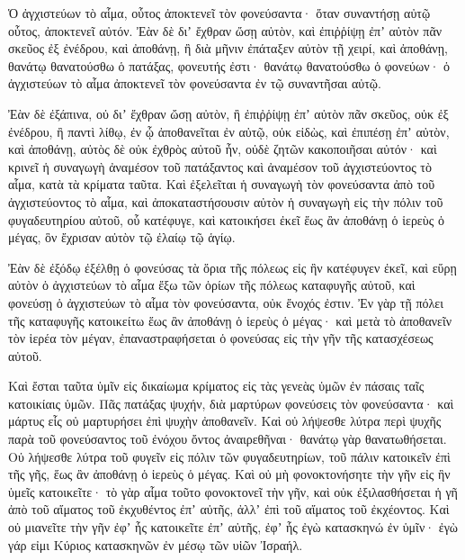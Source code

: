 {\par }{\PP {}Ὁ ἀγχιστεύων τὸ αἷμα, οὗτος ἀποκτενεῖ τὸν φονεύσαντα· ὅταν συναντήσῃ αὐτῷ οὗτος, ἀποκτενεῖ αὐτόν.
Ἐὰν δὲ διʼ ἔχθραν ὤσῃ αὐτὸν, καὶ ἐπιῤῥίψῃ ἐπʼ αὐτὸν πᾶν σκεῦος ἐξ ἐνέδρου, καὶ ἀποθάνῃ,
ἢ διὰ μῆνιν ἐπάταξεν αὐτὸν τῇ χειρί, καὶ ἀποθάνῃ, θανάτῳ θανατούσθω ὁ πατάξας, φονευτής ἐστι· θανάτῳ θανατούσθω ὁ φονεύων· ὁ ἀγχιστεύων τὸ αἷμα ἀποκτενεῖ τὸν φονεύσαντα ἐν τῷ συναντῆσαι αὐτῷ.
\par }{\PP {}Ἐὰν δὲ ἐξάπινα, οὐ διʼ ἔχθραν ὤσῃ αὐτὸν, ἢ ἐπιῤῥίψῃ ἐπʼ αὐτὸν πᾶν σκεῦος, οὐκ ἐξ ἐνέδρου,
ἢ παντὶ λίθῳ, ἐν ᾧ ἀποθανεῖται ἐν αὐτῷ, οὐκ εἰδὼς, καὶ ἐπιπέσῃ ἐπʼ αὐτὸν, καὶ ἀποθάνῃ, αὐτὸς δὲ οὐκ ἐχθρὸς αὐτοῦ ἦν, οὐδὲ ζητῶν κακοποιῆσαι αὐτόν·
καὶ κρινεῖ ἡ συναγωγὴ ἀναμέσον τοῦ πατάξαντος καὶ ἀναμέσον τοῦ ἀγχιστεύοντος τὸ αἷμα, κατὰ τὰ κρίματα ταῦτα.
Καὶ ἐξελεῖται ἡ συναγωγὴ τὸν φονεύσαντα ἀπὸ τοῦ ἀγχιστεύοντος τὸ αἷμα, καὶ ἀποκαταστήσουσιν αὐτὸν ἡ συναγωγὴ εἰς τὴν πόλιν τοῦ φυγαδευτηρίου αὐτοῦ, οὗ κατέφυγε, καὶ κατοικήσει ἐκεῖ ἕως ἂν ἀποθάνῃ ὁ ἱερεὺς ὁ μέγας, ὃν ἔχρισαν αὐτὸν τῷ ἐλαίῳ τῷ ἁγίῳ.
\par }{\PP {}Ἐὰν δὲ ἐξόδῳ ἐξέλθῃ ὁ φονεύσας τὰ ὅρια τῆς πόλεως εἰς ἣν κατέφυγεν ἐκεῖ,
καὶ εὕρῃ αὐτὸν ὁ ἀγχιστεύων τὸ αἷμα ἔξω τῶν ὁρίων τῆς πόλεως καταφυγῆς αὐτοῦ, καὶ φονεύσῃ ὁ ἀγχιστεύων τὸ αἷμα τὸν φονεύσαντα, οὐκ ἔνοχός ἐστιν.
Ἐν γὰρ τῇ πόλει τῆς καταφυγῆς κατοικείτω ἕως ἂν ἀποθάνῃ ὁ ἱερεὺς ὁ μέγας· καὶ μετὰ τὸ ἀποθανεῖν τὸν ἱερέα τὸν μέγαν, ἐπαναστραφήσεται ὁ φονεύσας εἰς τὴν γῆν τῆς κατασχέσεως αὐτοῦ.
\par }{\PP {}Καὶ ἔσται ταῦτα ὑμῖν εἰς δικαίωμα κρίματος εἰς τὰς γενεὰς ὑμῶν ἐν πάσαις ταῖς κατοικίαις ὑμῶν.
Πᾶς πατάξας ψυχήν, διὰ μαρτύρων φονεύσεις τὸν φονεύσαντα· καὶ μάρτυς εἷς οὐ μαρτυρήσει ἐπὶ ψυχὴν ἀποθανεῖν.
Καὶ οὐ λήψεσθε λύτρα περὶ ψυχῆς παρὰ τοῦ φονεύσαντος τοῦ ἐνόχου ὄντος ἀναιρεθῆναι· θανάτῳ γὰρ θανατωθήσεται.
Οὐ λήψεσθε λύτρα τοῦ φυγεῖν εἰς πόλιν τῶν φυγαδευτηρίων, τοῦ πάλιν κατοικεῖν ἐπὶ τῆς γῆς, ἕως ἂν ἀποθάνῃ ὁ ἱερεὺς ὁ μέγας.
Καὶ οὐ μὴ φονοκτονήσητε τὴν γῆν εἰς ἣν ὑμεῖς κατοικεῖτε· τὸ γὰρ αἷμα τοῦτο φονοκτονεῖ τὴν γῆν, καὶ οὐκ ἐξιλασθήσεται ἡ γῆ ἀπὸ τοῦ αἵματος τοῦ ἐκχυθέντος ἐπʼ αὐτῆς, ἀλλʼ ἐπὶ τοῦ αἵματος τοῦ ἐκχέοντος.
Καὶ οὐ μιανεῖτε τὴν γῆν ἐφʼ ἧς κατοικεῖτε ἐπʼ αὐτῆς, ἐφʼ ἧς ἐγὼ κατασκηνώ ἐν ὑμῖν· ἐγὼ γάρ εἰμι Κύριος κατασκηνῶν ἐν μέσῳ τῶν υἱῶν Ἰσραήλ.

}
